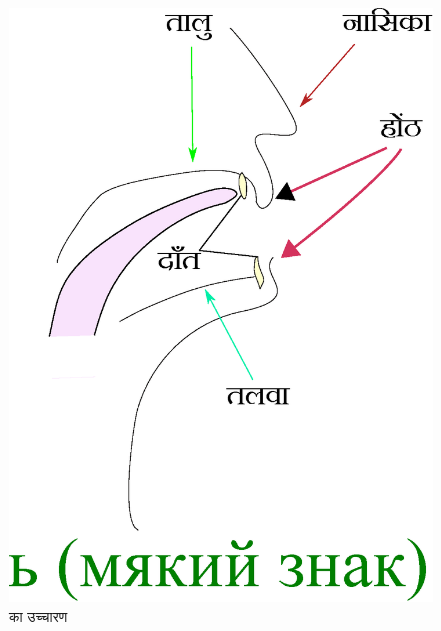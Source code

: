 \begin{figure}
    \label{fig:intro-pronounce-soft}

    \includegraphics[scale=0.35]{graphics/pronounce-soft}
    \caption{ का उच्चारण}

\end{figure}

